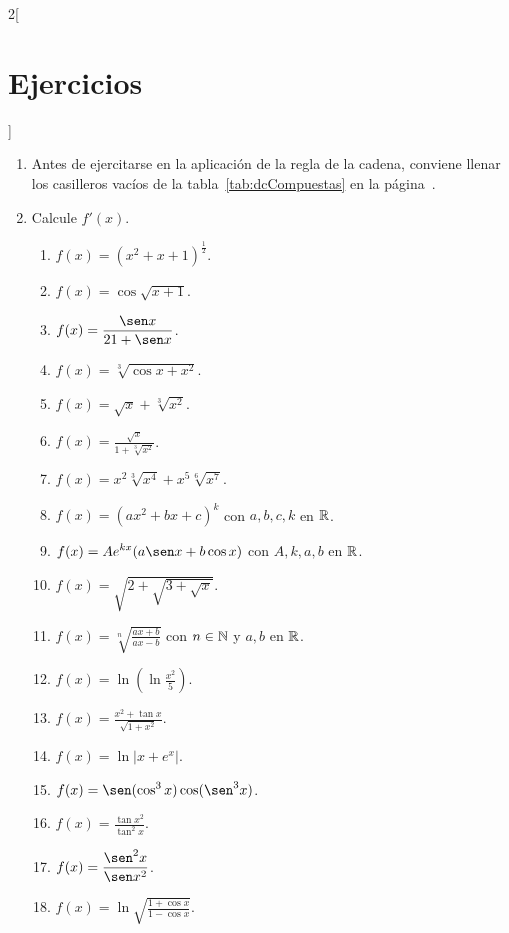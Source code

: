 \begin{multicols}{2}[\section{Ejercicios}]
\begingroup\small
\begin{enumerate}[leftmargin=*]
\item Antes de ejercitarse en la aplicación de la regla de la cadena, conviene llenar los
    casilleros vacíos de la tabla~\ref{tab:dcCompuestas} en la
    página~\pageref{tab:dcCompuestas}.
\item Calcule $f'(x)$.
  \begin{enumerate}[leftmargin=*]
    \item $f(x) = (x^2+x+1)^{\frac{1}{2}}$.
    \item $f(x) = \cos\sqrt{x+1}$.
    \item $\displaystyle f(x) = \frac{\sen x}{21 + \sen x}$.
    \item $\displaystyle f(x) = \sqrt[3]{\cos x + x^2}$.
    \item $\displaystyle f(x) = \sqrt{x} + \sqrt[3]{x^2}$.
    \item $\displaystyle f(x) = \frac{\sqrt{x}}{1 + \sqrt[3]{x^2}}$.
    \item $\displaystyle f(x) = x^2\sqrt[3]{x^4} + x^5\sqrt[6]{x^7}$.
    \item $\displaystyle f(x) = (ax^2 + bx + c)^k$ con $a, b, c, k$ en $\mathbb{R}$.
    \item $\displaystyle f(x) = Ae^{kx}(a\sen x + b\cos x)$ con $A, k, a, b$ en $\mathbb{R}$.
    \item $\displaystyle f(x) = \sqrt{2 + \sqrt{3 + \sqrt{x}}}$.
    \item $\displaystyle f(x) = \sqrt[n]{\frac{ax + b}{ax - b}}$ con $n\in\mathbb{N}$ y $a, b$ en
        $\mathbb{R}$.
    \item $\displaystyle f(x) = \ln\left(\ln\frac{x^2}{5}\right)$.
    \item $\displaystyle f(x) = \frac{x^2 + \tan x}{\sqrt{1 + x^2}}$.
    \item $\displaystyle f(x) = \ln\left|x + e^x\right|$.
    \item $\displaystyle f(x) = \sen(\cos^3 x)\cos(\sen^3 x)$.
    \item $\displaystyle f(x) = \frac{\tan x^2}{\tan^2 x}$.
    \item $\displaystyle f(x) = \frac{\sen^2 x}{\sen x^2}$.
    \item $\displaystyle f(x) = \ln\sqrt{\frac{1 + \cos x}{1 - \cos x}}$.
  \end{enumerate}


\end{enumerate}
\end{multicols}
